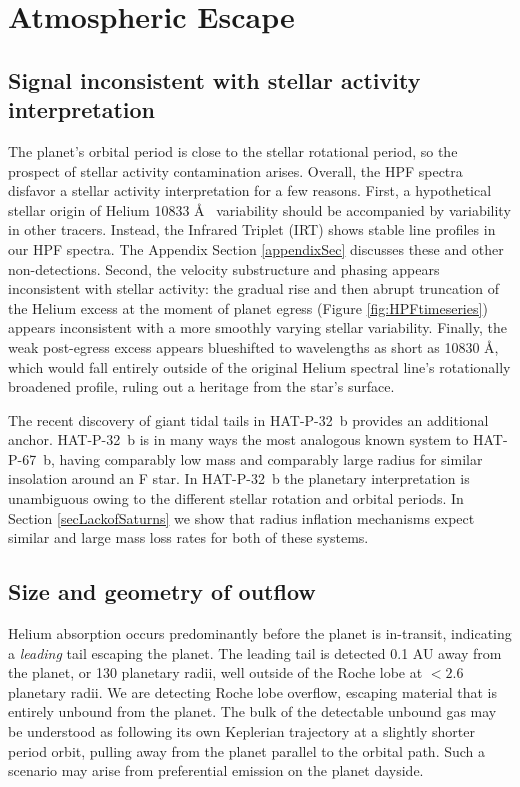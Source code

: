 \documentclass[twocolumn]{aastex631}
\begin{document}
\section{Atmospheric Escape}\label{secResults}

\subsection{Signal inconsistent with stellar activity interpretation}
The planet's orbital period is close to the stellar rotational period, so the prospect of stellar activity contamination arises.  Overall, the HPF spectra disfavor a stellar activity interpretation for a few reasons.  First, a hypothetical stellar origin of Helium 10833 \AA~ variability should be accompanied by variability in other tracers.  Instead, the  Infrared Triplet (IRT) shows stable line profiles in our HPF spectra.  The Appendix Section \ref{appendixSec} discusses these and other non-detections.  Second, the velocity substructure and phasing appears inconsistent with stellar activity: the gradual rise and then abrupt truncation of the Helium excess at the moment of planet egress (Figure \ref{fig:HPFtimeseries}) appears inconsistent with a more smoothly varying stellar variability.  Finally, the weak post-egress excess appears blueshifted to wavelengths as short as 10830 \AA, which would fall entirely outside of the original Helium spectral line's rotationally broadened profile, ruling out a heritage from the star's surface.  

The recent discovery of giant tidal tails in HAT-P-32~b \citep{doi:10.1126/sciadv.adf8736} provides an additional anchor.  HAT-P-32~b is in many ways the most analogous known system to HAT-P-67~b, having comparably low mass and comparably large radius for similar insolation around an F star.  In HAT-P-32~b the planetary interpretation is unambiguous owing to the different stellar rotation and orbital periods.  In Section \ref{secLackofSaturns} we show that radius inflation mechanisms expect similar and large mass loss rates for both of these systems.  



\subsection{Size and geometry of outflow}
Helium absorption occurs predominantly before the planet is in-transit, indicating a \emph{leading} tail escaping the planet.  The leading tail is detected 0.1 AU away from the planet, or 130 planetary radii, well outside of the Roche lobe at $<2.6$ planetary radii.  We are detecting Roche lobe overflow, escaping material that is entirely unbound from the planet.  The bulk of the detectable unbound gas may be understood as following its own Keplerian trajectory at a slightly shorter period orbit, pulling away from the planet parallel to the orbital path.  Such a scenario may arise from preferential emission on the planet dayside.
\end{document}
